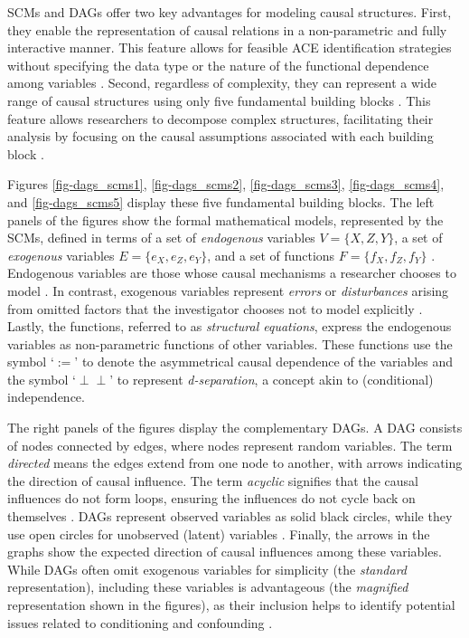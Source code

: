 \documentclass[
  authoryear,
  review,
  1p]{elsarticle}
\begin{document}
SCMs and DAGs offer two key advantages for modeling causal structures.
First, they enable the representation of causal relations in a
non-parametric and fully interactive manner. This feature allows for
feasible ACE identification strategies without specifying the data type
or the nature of the functional dependence among variables
\citep{Morgan_et_al_2014}. Second, regardless of complexity, they can
represent a wide range of causal structures using only five fundamental
building blocks \citep{Neal_2020, McElreath_2020}. This feature allows
researchers to decompose complex structures, facilitating their analysis
by focusing on the causal assumptions associated with each building
block \citep{McElreath_2020}.

Figures \ref{fig-dags_scms1}, \ref{fig-dags_scms2},
\ref{fig-dags_scms3}, \ref{fig-dags_scms4}, and \ref{fig-dags_scms5}
display these five fundamental building blocks. The left panels of the
figures show the formal mathematical models, represented by the SCMs,
defined in terms of a set of \emph{endogenous} variables
\(V=\{X,Z,Y\}\), a set of \emph{exogenous} variables
\(E=\{e_{X},e_{Z},e_{Y}\}\), and a set of functions
\(F=\{f_{X},f_{Z},f_{Y}\}\)
\citep{Pearl_2009, Cinelli_et_al_2020, Neal_2020}. Endogenous variables
are those whose causal mechanisms a researcher chooses to model
\citep{Neal_2020}. In contrast, exogenous variables represent
\emph{errors} or \emph{disturbances} arising from omitted factors that
the investigator chooses not to model explicitly
\citep[pp.~27,68]{Pearl_2009}. Lastly, the functions, referred to as
\emph{structural equations}, express the endogenous variables as
non-parametric functions of other variables. These functions use the
symbol `\(:=\)' to denote the asymmetrical causal dependence of the
variables and the symbol `\(\perp\!\!\!\perp\)' to represent
\emph{d-separation}, a concept akin to (conditional) independence.

The right panels of the figures display the complementary DAGs. A DAG
consists of nodes connected by edges, where nodes represent random
variables. The term \emph{directed} means the edges extend from one node
to another, with arrows indicating the direction of causal influence.
The term \emph{acyclic} signifies that the causal influences do not form
loops, ensuring the influences do not cycle back on themselves
\citep{McElreath_2020}. DAGs represent observed variables as solid black
circles, while they use open circles for unobserved (latent) variables
\citep{Morgan_et_al_2014}. Finally, the arrows in the graphs show the
expected direction of causal influences among these variables. While
DAGs often omit exogenous variables for simplicity (the \emph{standard}
representation), including these variables is advantageous (the
\emph{magnified} representation shown in the figures), as their
inclusion helps to identify potential issues related to conditioning and
confounding \citep{Cinelli_et_al_2020}.
\end{document}
